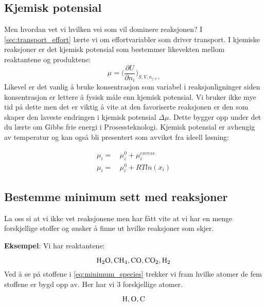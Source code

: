 \subsection{Kjemisk potensial}
Men hvordan vet vi hvilken vei som vil dominere reaksjonen? I \cref{sec:transport_effort} lærte vi om effortvariabler som driver transport. I kjemiske reaksjoner er det kjemisk potensial som bestemmer likevekten mellom reaktantene og produktene:
\begin{equation}
    \mu = \Big(
    \frac{\partial U}{\partial n_i}
    \Big)_{S,V,n_{j\neq i}}
\end{equation}
Likevel er det vanlig å bruke konsentrasjon som variabel i reaksjonligninger siden konsentrasjon er lettere å fysisk måle enn kjemisk potensial. Vi bruker ikke mye tid på dette men det er viktig å vite at den favoriserte reaksjonen er den som skaper den laveste endringen i kjemisk potensial $\Delta \mu$. Dette bygger opp under det du lærte om Gibbs frie energi i Prosessteknologi. Kjemisk potensial er avhengig av temperatur og kan også bli presentert som avviket fra ideell løsning: 

\begin{equation}
    \begin{split}
    \mu_i =&\, \mu_{i}^0 +\mu_{i}^{excess}\\
    \mu_i =&\, \mu_{i}^0 + RTln(x_i) 
    \end{split}
\end{equation}


\subsection{Bestemme minimum sett med reaksjoner}\label{sec:set_med_reaksjoner}
La oss si at vi ikke vet reaksjonene men har fått vite at vi har en menge forskjellige stoffer og ønsker å finne ut hvilke reaksjoner som skjer. 

\textbf{Eksempel}:
Vi har reaktantene:

\begin{equation}
    \label{eq:minimum_species}
   \ce{H2O,CH4,CO,CO2,H2}
\end{equation}
Ved å se på stoffene i \ref{eq:minimum_species} trekker vi fram hvilke atomer de fem stoffene er bygd opp av. Her har vi 3 forskjellige atomer.

\begin{equation}
    \label{eq:minimum_species_atom}
    \ce{H,O,C}
\end{equation}

